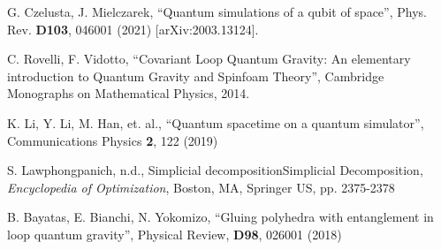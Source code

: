 \documentclass[a4paper,11pt,aps,tightenlines,nofootinbib]{revtex4}
\begin{document}
\vspace{0cm}

\begin{thebibliography}{99}

        G. Czelusta, J. Mielczarek,
        ``Quantum simulations of a qubit of space'',
        Phys. Rev. {\bf D103}, 046001 (2021)
        [arXiv:2003.13124].

        C. Rovelli, F. Vidotto,
        ``Covariant Loop Quantum Gravity: An elementary introduction to Quantum Gravity and Spinfoam Theory'',
        Cambridge Monographs on Mathematical Physics, 2014.

        K. Li, Y. Li, M. Han, et. al.,
        ``Quantum spacetime on a quantum simulator'',
        Communications Physics {\bf 2}, 122 (2019)

        S. Lawphongpanich, n.d., 
        Simplicial decompositionSimplicial Decomposition, 
        \emph{Encyclopedia of Optimization}, Boston, MA, Springer US, pp. 2375-2378

        B. Bayatas, E. Bianchi, N. Yokomizo,
        ``Gluing polyhedra with entanglement in loop quantum gravity'',
        Physical Review, {\bf D98}, 026001 (2018)
        


\end{thebibliography}  
\end{document}
